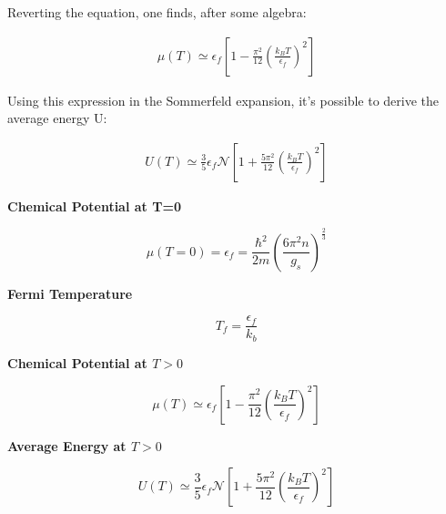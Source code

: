 \documentclass{article}
\begin{document}
Reverting the equation, one finds, after some algebra:

\begin{tcolorbox}[colframe=gray!50, colback=gray!10, coltitle=black, title= $\mu(T>0)$]

    \begin{equation}
        \begin{aligned}
            \mu(T)\simeq \epsilon_f\left[1-\frac{\pi^2}{12}\left(\frac{k_BT}{\epsilon_f}\right)^2\right]
        \end{aligned}
    \end{equation}
\end{tcolorbox}


Using this expression in the Sommerfeld expansion, it's possible to derive the average energy U:

\begin{tcolorbox}[colframe=gray!50, colback=gray!10, coltitle=black, title= $U(T>0)$]

    \begin{equation}
        \begin{aligned}
            U(T)\simeq \frac{3}{5}\epsilon_f\mathcal{N}\left[1+\frac{5\pi^2}{12}\left(\frac{k_BT}{\epsilon_f}\right)^2\right]
        \end{aligned}
    \end{equation}

\end{tcolorbox}

\newpage

\newpage
\begin{tcolorbox}[colframe=gray!90, colback=gray!5, coltitle=white, sharp corners, title=\textbf{Fermions, Summary}, fonttitle=\large\bfseries]
    \textbf{Chemical Potential at T=0}

    \begin{equation}
        \mu(T=0)=\epsilon_f=\frac{\hbar^2}{2m}\left(\frac{6\pi^2n}{g_s}\right)^{\frac{2}{3}}
    \end{equation}

    \textbf{Fermi Temperature}

    \begin{equation}
        T_f=\frac{\epsilon_f}{k_b}
    \end{equation}

    \textbf{Chemical Potential at $T>0$}

    \begin{equation}
        \mu(T)\simeq \epsilon_f\left[1-\frac{\pi^2}{12}\left(\frac{k_BT}{\epsilon_f}\right)^2\right]
    \end{equation}

    \textbf{Average Energy at $T>0$}

    \begin{equation}
        U(T)\simeq \frac{3}{5}\epsilon_f\mathcal{N}\left[1+\frac{5\pi^2}{12}\left(\frac{k_BT}{\epsilon_f}\right)^2\right]
    \end{equation}


\end{tcolorbox}
\newpage
\end{document}
